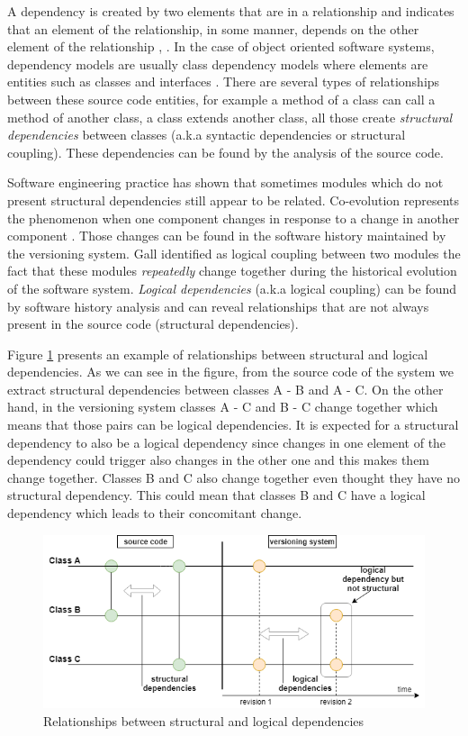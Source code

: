 \documentclass[conference]{IEEEtran}
\begin{document}
A dependency is created by two elements that are in a relationship and indicates that an element of the relationship, in some manner, depends on the other element of the relationship \cite{Booch:2004:OAD:975416}, \cite{Cataldo2009SoftwareDW}. In the case of object oriented software systems, dependency models are usually class dependency models where elements are entities such as classes and interfaces \cite{Sangal:2005:UDM:1094811.1094824}. There are several types of relationships between these source code entities, for example a method of a class can call a method of another class, a class extends another class, all those create  \textit{structural dependencies} between classes (a.k.a syntactic dependencies or structural coupling). These dependencies can be found by the analysis of the source code.

Software engineering practice has shown that sometimes modules which do not present structural dependencies still appear to be related. Co-evolution represents the phenomenon when one component changes in response to a change in another component \cite{Yu:2007:UCC:1231330.1231370}. Those changes can be found in the software history maintained by the versioning system. Gall \cite{Gall:1998:DLC:850947.853338} identified as logical coupling between two modules the fact that these modules  \textit{repeatedly} change together during the historical evolution of the software system. 
 \textit{Logical dependencies} (a.k.a logical coupling) can be found by software history analysis and can reveal relationships that are not always present in the source code (structural dependencies).  

Figure \ref{fig:fig1} presents an example of relationships between structural and logical dependencies. As we can see in the figure, from the source code of the system we extract structural dependencies between classes A - B and A - C. On the other hand, in the versioning  system classes A - C and B - C change together which means that those pairs can be logical dependencies. It is expected for a structural dependency to also be a logical dependency since changes in one element of the dependency could trigger also changes in the other one and this makes them change together. Classes B and C also change together even thought they have no structural dependency. This could mean that classes B and C have a logical dependency which leads to their concomitant change.
\begin{figure}[h]
\includegraphics[scale=0.43]{fig1.png}
\caption{Relationships between structural and logical dependencies }
\label{fig:fig1}
\centering
\end{figure}
\end{document}
